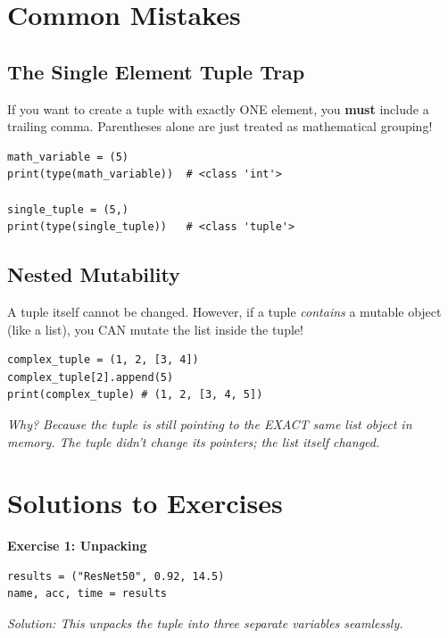 \section{Common Mistakes}

\subsection{The Single Element Tuple Trap}
If you want to create a tuple with exactly ONE element, you \textbf{must} include a trailing comma. Parentheses alone are just treated as mathematical grouping!
\begin{lstlisting}
math_variable = (5)
print(type(math_variable))  # <class 'int'>

single_tuple = (5,)
print(type(single_tuple))   # <class 'tuple'>
\end{lstlisting}

\subsection{Nested Mutability}
A tuple itself cannot be changed. However, if a tuple \textit{contains} a mutable object (like a list), you CAN mutate the list inside the tuple!
\begin{lstlisting}
complex_tuple = (1, 2, [3, 4])
complex_tuple[2].append(5)
print(complex_tuple) # (1, 2, [3, 4, 5])
\end{lstlisting}
\textit{Why? Because the tuple is still pointing to the EXACT same list object in memory. The tuple didn't change its pointers; the list itself changed.}


\section{Solutions to Exercises}

\textbf{Exercise 1: Unpacking}
\begin{lstlisting}
results = ("ResNet50", 0.92, 14.5)
name, acc, time = results
\end{lstlisting}
\textit{Solution: This unpacks the tuple into three separate variables seamlessly.}

